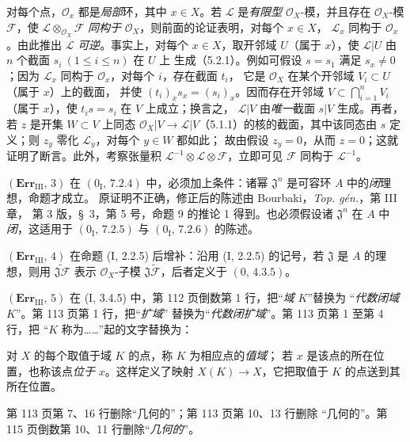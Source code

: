 \documentclass[UTF8,fontset=none,11pt,oneside,openany]{ctexbook}
\newcommand{\oldpage}[2][]{%
  \hypertarget{ega-source-page-#1-#2}{}%
  \marginnote{\scriptsize\textbf{#1}~|~#2}\ignorespaces}
\begin{document}
\oldpage[III]{219}
对每个点，$\mathscr O_x$ 都是\emph{局部}环，其中 $x\in X$。若 $\mathscr L$
是\emph{有限型} $\mathscr O_X$-模，并且存在 $\mathscr O_X$-模
$\mathscr F$，使 $\mathscr L\otimes_{\mathscr O_X}\mathscr F$
\emph{同构于} $\mathscr O_X$，则前面的论证表明，对每个 $x\in X$，
$\mathscr L_x$ 同构于 $\mathscr O_x$。由此推出 $\mathscr L$
\emph{可逆}。事实上，对每个 $x\in X$，取开邻域 $U$（属于 $x$），使
$\mathscr L|U$ 由 $n$ 个截面 $s_i\ (1\leq i\leq n)$ 在 $U$ 上
生成（5.2.1）。例如可假设 $s=s_1$ 满足 $s_x\ne0$；因为
$\mathscr L_x$ 同构于 $\mathscr O_x$，对每个 $i$，存在截面 $t_i$，
它是 $\mathscr O_X$ 在某个开邻域 $V_i\subset U$（属于 $x$）上的截面，
并使 $(t_i)_x s_x=(s_i)_x$。因而存在开邻域
$V\subset\bigcap_{i=1}^nV_i$（属于 $x$），使 $t_i s=s_i$ 在 $V$ 上成立；换言之，
$\mathscr L|V$ 由\emph{唯一}截面 $s|V$ 生成。再者，若 $z$ 是开集
$W\subset V$ 上同态
$\mathscr O_X|V\to\mathscr L|V$（5.1.1）的核的截面，其中该同态由
$s$ 定义；则 $z_y$ 零化 $\mathscr L_y$，对每个 $y\in W$ 都如此；
故由假设 $z_y=0$，从而
$z=0$；这就证明了断言。此外，考察张量积
$\mathscr L^{-1}\otimes\mathscr L\otimes\mathscr F$，立即可见
$\mathscr F$ 同构于 $\mathscr L^{-1}$。

\noindent\textbf{$(\mathbf{Err}_{\mathrm{III}},\,3)$} 在
$(0_{\mathrm I},\,7.2.4)$ 中，必须加上条件：诸幂
$\mathfrak J^n$ 是可容环 $A$ 中的\emph{闭}理想，命题才成立。
原证明不正确，修正后的陈述由 Bourbaki，\emph{Top. gén.}，第 III 章，
第 3 版，\S~3，第 5 号，命题 9 的推论 1 得到。也必须假设诸
$\mathfrak J^n$ 在 $A$ 中\emph{闭}，这适用于
$(0_{\mathrm I},\,7.2.5)$ 与 $(0_{\mathrm I},\,7.2.6)$ 的陈述。

\noindent\textbf{$(\mathbf{Err}_{\mathrm{III}},\,4)$} 在命题
(I, 2.2.5) 后增补：沿用 (I, 2.2.5) 的记号，若 $\mathfrak J$
是 $A$ 的理想，则用 $\widetilde{\mathfrak J\mathscr F}$ 表示
$\mathscr O_X$-子模 $\mathfrak J\widetilde{\mathscr F}$，后者定义于
$(0,\,4.3.5)$。

\noindent\textbf{$(\mathbf{Err}_{\mathrm{III}},\,5)$} 在
(I, 3.4.5) 中，第 112 页倒数第 1 行，把“\emph{域} $K$”替换为
“\emph{代数闭域} $K$”。第 113 页第 1 行，把“\emph{扩域}”
替换为“\emph{代数闭扩域}”。第 113 页第 1 至第 4 行，把
“$K$ 称为……”起的文字替换为：

对 $X$ 的每个取值于域 $K$ 的点，称 $K$ 为相应点的\emph{值域}；
若 $x$ 是该点的所在位置，也称该点\emph{位于} $x$。这样定义了映射
$X(K)\to X$，它把取值于 $K$ 的点送到其所在位置。

第 113 页第 7、16 行删除“几何的”；第 113 页第 10、13 行删除
“几何的”。第 115 页倒数第 10、11 行删除“\emph{几何的}”。
\end{document}

